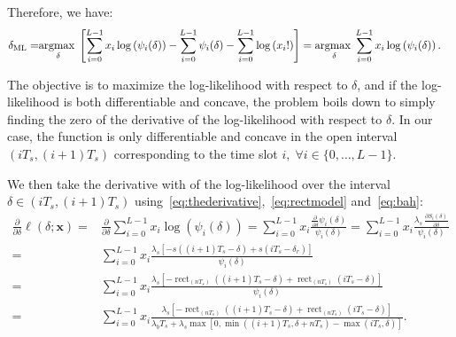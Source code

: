 \noindent
Therefore, we have:
\begin{equation}
\begin{aligned}
\delta_{\mathrm{ML}} 
= & \underset{\delta}{\operatorname*{argmax\;}}
\left[
\sum_{i=0}^{L-1} x_i \log \left( \psi_i(\delta)\right)
-\sum_{i=0}^{L-1}  \psi_i(\delta)
-\sum_{i=0}^{L-1}  \log \left(x_{i}!\right)
\right]
=\underset{\delta}{\operatorname*{argmax\;}} 
\sum_{i=0}^{L-1} x_i \log \left( \psi_i(\delta)\right).
\end{aligned}
\label{eq:sweetsix}
\end{equation}

\noindent
The objective is to maximize the log-likelihood with respect to \(\delta\), and if the log-likelihood is both differentiable and concave, the problem boils down to simply finding the zero of the derivative of the log-likelihood with respect to \(\delta\). In our case, the function is only differentiable and concave in the open interval \((iT_s,(i+1)T_s)\) corresponding to the time slot \(i,\;\forall i\in\{0,\ldots,L-1\}\).

\noindent
We then take the derivative with of the log-likelihood over the interval \(\delta \in(iT_s,(i+1)T_s)\) using~\eqref{eq:thederivative},~\eqref{eq:rectmodel} and~\eqref{eq:bah}:
\begin{equation}
\begin{aligned}
\frac{\partial}{\partial \delta} \ell(\delta ; \mathbf{x})
= &\frac{\partial}{\partial \delta}\sum_{i=0}^{L-1} x_i \log \left( \psi_i(\delta)\right)
= \sum_{i=0}^{L-1}x_i\frac{ \frac{\partial}{\partial \delta}\psi_i(\delta)}{\psi_i(\delta)}
= \sum_{i=0}^{L-1}x_i\frac{\lambda_{s}\,\frac{\partial S_i(\delta)}{\partial \delta}}{\psi_i(\delta)}\\
= &\sum_{i=0}^{L-1}x_i\frac{\lambda_{s}
\left[-s\left((i+1)T_s-\delta\right)+s\left(iT_s-\delta_r\right)\right]}{\psi_i(\delta)}\\
= &\sum_{i=0}^{L-1}x_i\frac{\lambda_{s}
\left[-\operatorname{rect}_{(nT_s)}\left((i+1)T_s-\delta\right)+\operatorname{rect}_{(nT_s)}\left(iT_s-\delta\right)\right]}{\psi_i(\delta)}\\
= &\sum_{i=0}^{L-1}x_i\frac{\lambda_{s}
\left[-\operatorname{rect}_{(nT_s)}\left((i+1)T_s-\delta\right)+\operatorname{rect}_{(nT_s)}\left(iT_s-\delta\right)\right]}
{\lambda_{b}T_s+\lambda_{s}\max \left[0, \min \left((i+1) T_s, \delta+n T_s\right)-\max \left(i T_s, \delta\right)\right]}.
\end{aligned}
\label{eq:ilterrore}
\end{equation}

